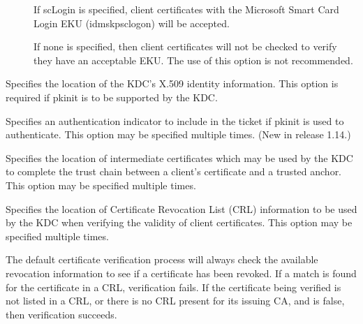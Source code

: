 \documentclass[letterpaper,10pt,english]{sphinxmanual}
\begin{document}
\begin{description}
\begin{description}
\item[{}] \leavevmode
\sphinxAtStartPar
If scLogin is specified, client certificates with the
Microsoft Smart Card Login EKU (id\sphinxhyphen{}ms\sphinxhyphen{}kp\sphinxhyphen{}sc\sphinxhyphen{}logon) will be
accepted.

\item[{}] \leavevmode
\sphinxAtStartPar
If none is specified, then client certificates will not be
checked to verify they have an acceptable EKU.  The use of
this option is not recommended.

\end{description}

\item[{\sphinxstylestrong{pkinit\_identity}}] \leavevmode
\sphinxAtStartPar
Specifies the location of the KDC’s X.509 identity information.
This option is required if pkinit is to be supported by the KDC.

\item[{\sphinxstylestrong{pkinit\_indicator}}] \leavevmode
\sphinxAtStartPar
Specifies an authentication indicator to include in the ticket if
pkinit is used to authenticate.  This option may be specified
multiple times.  (New in release 1.14.)

\item[{\sphinxstylestrong{pkinit\_pool}}] \leavevmode
\sphinxAtStartPar
Specifies the location of intermediate certificates which may be
used by the KDC to complete the trust chain between a client’s
certificate and a trusted anchor.  This option may be specified
multiple times.

\item[{\sphinxstylestrong{pkinit\_revoke}}] \leavevmode
\sphinxAtStartPar
Specifies the location of Certificate Revocation List (CRL)
information to be used by the KDC when verifying the validity of
client certificates.  This option may be specified multiple times.

\item[{\sphinxstylestrong{pkinit\_require\_crl\_checking}}] \leavevmode
\sphinxAtStartPar
The default certificate verification process will always check the
available revocation information to see if a certificate has been
revoked.  If a match is found for the certificate in a CRL,
verification fails.  If the certificate being verified is not
listed in a CRL, or there is no CRL present for its issuing CA,
and  is false, then verification
succeeds.


\end{description}
\end{document}
